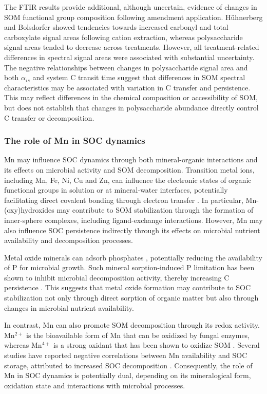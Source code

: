 \documentclass[preprint,12pt]{elsarticle}
\begin{document}
The FTIR results provide additional, although uncertain, evidence of changes in SOM functional group composition following amendment application. Hühnerberg and Bolsdorfer showed tendencies towards increased carbonyl and total carboxylate signal areas following cation extraction, whereas polysaccharide signal areas tended to decrease across treatments. However, all treatment-related differences in spectral signal areas were associated with substantial uncertainty. The negative relationships between changes in polysaccharide signal area and both $\alpha_{is}$ and system C transit time suggest that differences in SOM spectral characteristics may be associated with variation in C transfer and persistence. This may reflect differences in the chemical composition or accessibility of SOM, but does not establish that changes in polysaccharide abundance directly control C transfer or decomposition.

\subsubsection{The role of Mn in SOC dynamics}

Mn may influence SOC dynamics through both mineral-organic interactions and its effects on microbial activity and SOM decomposition. Transition metal ions, including Mn, Fe, Ni, Cu and Zn, can influence the electronic states of organic functional groups in solution or at mineral-water interfaces, potentially facilitating direct covalent bonding through electron transfer \citep{kleber2021dynamic}. In particular, Mn-(oxy)hydroxides may contribute to SOM stabilization through the formation of inner-sphere complexes, including ligand-exchange interactions. However, Mn may also influence SOC persistence indirectly through its effects on microbial nutrient availability and decomposition processes.

Metal oxide minerals can adsorb phosphates \citep{franks2021role}, potentially reducing the availability of P for microbial growth. Such mineral sorption-induced P limitation has been shown to inhibit microbial decomposition activity, thereby increasing C persistence \citep{bramble2025landuse}. This suggests that metal oxide formation may contribute to SOC stabilization not only through direct sorption of organic matter but also through changes in microbial nutrient availability.

In contrast, Mn can also promote SOM decomposition through its redox activity. Mn$^{2+}$ is the bioavailable form of Mn that can be oxidized by fungal enzymes, whereas Mn$^{4+}$ is a strong oxidant that has been shown to oxidize SOM \citep{paulus2024manganese}. Several studies have reported negative correlations between Mn availability and SOC storage, attributed to increased SOC decomposition \citep{Berg2003,Keiluweit2015}. Consequently, the role of Mn in SOC dynamics is potentially dual, depending on its mineralogical form, oxidation state and interactions with microbial processes.
\end{document}
